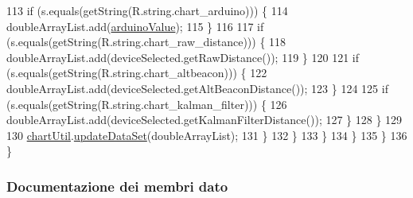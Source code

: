 \begin{DoxyCode}
113                                 \textcolor{keywordflow}{if} (s.equals(getString(R.string.chart\_arduino))) \{
114                                     doubleArrayList.add(\hyperlink{classit_1_1unibo_1_1torsello_1_1bluetoothpositioning_1_1fragment_1_1devicesObservers_1_1DeviceChartFragment_a913e9b39a11d361793d7884bd2ddfd4c_a913e9b39a11d361793d7884bd2ddfd4c}{arduinoValue});
115                                 \}
116 
117                                 \textcolor{keywordflow}{if} (s.equals(getString(R.string.chart\_raw\_distance))) \{
118                                     doubleArrayList.add(deviceSelected.getRawDistance());
119                                 \}
120 
121                                 \textcolor{keywordflow}{if} (s.equals(getString(R.string.chart\_altbeacon))) \{
122                                     doubleArrayList.add(deviceSelected.getAltBeaconDistance());
123                                 \}
124 
125                                 \textcolor{keywordflow}{if} (s.equals(getString(R.string.chart\_kalman\_filter))) \{
126                                     doubleArrayList.add(deviceSelected.getKalmanFilterDistance());
127                                 \}
128                             \}
129 
130                             \hyperlink{classit_1_1unibo_1_1torsello_1_1bluetoothpositioning_1_1fragment_1_1devicesObservers_1_1DeviceChartFragment_afe4ee0e5d07f3efb6887428c9ef04a2e_afe4ee0e5d07f3efb6887428c9ef04a2e}{chartUtil}.\hyperlink{classit_1_1unibo_1_1torsello_1_1bluetoothpositioning_1_1util_1_1ChartUtil_aa9bda04d2c2058fb1b3fcd72c5a7471d_aa9bda04d2c2058fb1b3fcd72c5a7471d}{updateDataSet}(doubleArrayList);
131                         \}
132                     \}
133                 \}
134             \}
135         \}
136     \}
\end{DoxyCode}


\subsubsection{Documentazione dei membri dato}
\hypertarget{classit_1_1unibo_1_1torsello_1_1bluetoothpositioning_1_1fragment_1_1devicesObservers_1_1DeviceChartFragment_a913e9b39a11d361793d7884bd2ddfd4c_a913e9b39a11d361793d7884bd2ddfd4c}{}\label{classit_1_1unibo_1_1torsello_1_1bluetoothpositioning_1_1fragment_1_1devicesObservers_1_1DeviceChartFragment_a913e9b39a11d361793d7884bd2ddfd4c_a913e9b39a11d361793d7884bd2ddfd4c} 
